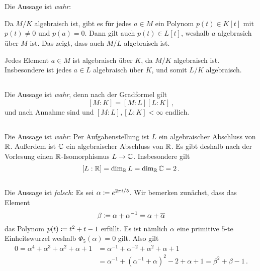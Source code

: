 \section{}





\subsection{}

Die Aussage ist \emph{wahr}:

Da $M/K$ algebraisch ist, gibt es für jedes $a \in M$ ein Polynom $p(t) \in K[t]$ mit $p(t) \neq 0$ und $p(a) = 0$.
Dann gilt auch $p(t) \in L[t]$, weshalb $a$ algebrasich über $M$ ist.
Das zeigt, dass auch $M/L$ algebraisch ist.

Jedes Element $a \in M$ ist algebraisch über $K$, da $M/K$ algebraisch ist.
Insbesondere ist jedes $a \in L$ algebraisch über $K$, und somit $L/K$ algebraisch.





\subsection{}

Die Aussage ist \emph{wahr}, denn nach der Gradformel gilt
\[
    [M : K]
  = [M : L][L : K] \,,
\]
und nach Annahme sind und $[M : L], [L : K] < \infty$ endlich.





\subsection{}

Die Aussage ist \emph{wahr}:
Per Aufgabenstellung ist $L$ ein algebraischer Abschluss von $\mathbb{R}$.
Außerdem ist $\mathbb{C}$ ein algebraischer Abschluss von $\mathbb{R}$.
Es gibt deshalb nach der Vorlesung einen $\mathbb{R}$-Isomorphismus $L \to \mathbb{C}$.
Insbesondere gilt
\[
    [L : \mathbb{R}]
  = \dim_{\mathbb{R}} L
  = \dim_{\mathbb{R}} \mathbb{C}
  = 2 \,.
\]





\subsection{}

Die Aussage ist \emph{falsch}:
Es sei $\alpha \coloneqq e^{2 \pi i / 5}$.
Wir bemerken zunächst, dass das Element
\[
          \beta
  \coloneqq \alpha + \alpha^{-1}
  =       \alpha + \overline{\alpha}
\]
das Polynom $p(t) \coloneqq t^2 + t - 1$ erfüllt.
Es ist nämlich $\alpha$ eine primitive $5$-te Einheitswurzel weshalb $\Phi_5(\alpha) = 0$ gilt.
Also gilt
\begin{align*}
      0
   =  \alpha^4 + \alpha^3 + \alpha^2 + \alpha + 1
  &=  \alpha^{-1} + \alpha^{-2} + \alpha^2 + \alpha + 1
  \\
  &=  \alpha^{-1} + (\alpha^{-1} + \alpha)^2 - 2 + \alpha + 1
   =  \beta^2 + \beta - 1 \,.
\end{align*}

